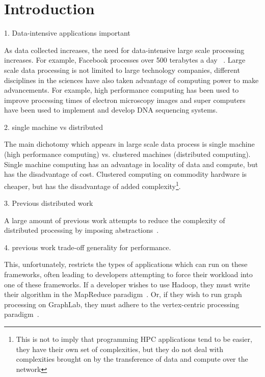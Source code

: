 \section{Introduction} 
\label{sec:intro}


\ac{1. Data-intensive applications important}

As data collected increases, the need for data-intensive large scale processing
increases. For example, Facebook processes over 500 terabytes a day~
. Large scale data processing is not limited to large
technology companies, different disciplines in the sciences have also taken
advantage of computing power to make advancements. For example, high performance
computing has been used to improve processing times of electron microscopy
images and super computers have been used to implement and develop DNA
sequencing systems.

\ac{2. single machine vs distributed}

The main dichotomy
which appears in large scale data process is single machine (high performance
computing) vs. clustered machines (distributed computing). Single machine
computing has an advantage in locality of data and compute, but has the
disadvantage of cost. Clustered computing on commodity hardware is cheaper, but
has the disadvantage of added complexity\footnote{This is not to imply that
programming HPC applications tend to be easier, they have their own set of
complexities, but they do not deal with complexities brought on by the
transference of data and compute over the network}. 

\ac{3. Previous distributed work}

A large amount of previous work attempts to reduce the complexity of
distributed processing by imposing abstractions~\cite{Dean2004,Low2010,Murray2013}.

\ac{4. previous work trade-off generality for performance.}

This, unfortunately, restricts the types of applications which can run on these
frameworks, often leading to developers attempting to force their workload into
one of these frameworks. If a developer wishes to use Hadoop, they must write
their algorithm in the MapReduce paradigm~\cite{Dean2004}. Or, if they wish to
run graph processing on GraphLab, they must adhere to the vertex-centric
processing paradigm~\cite{Low2010}.

